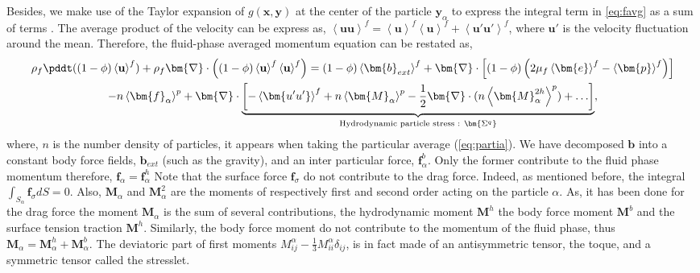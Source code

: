 Besides, we make use of the Taylor expansion of $g(\textbf{x},\bm{y})$ at the center of the particle $\bm{y}_\alpha$ to express the integral term in \ref{eq:favg} as a sum of terms \citep{jackson1997locally}.  
The average product of the velocity can be express as, $\left<\bm{uu}\right>^f = \left<\textbf{u}\right>^f\left<\textbf{u}\right>^f + \left<\bm{u'u'}\right>^f$, where $\bm{u'}$ is the velocity fluctuation around the mean. 
Therefore, the fluid-phase averaged momentum equation can be restated as, 
\begin{multline}
    \rho_f\pddt ((1-\phi)\left<\textbf{u}\right>^f) 
    + \rho_f\bm{\nabla}\cdot\left((1-\phi) \left<\textbf{u}\right>^f\left<\textbf{u}\right>^f\right)
    = (1-\phi)\left<\bm{b}_{ext}\right>^f 
    +\bm{\nabla}\cdot\left[(1-\phi) \left(2\mu_f\left<\bm{e}\right>^f 
    -\left<\bm{p}\right>^f\right)\right]\\
    -n\left<\bm{f}_\alpha\right>^p
    +\bm{\nabla}\cdot
    \underbrace{
        \left[
            - \left<\bm{u'u'}\right>^f 
            +n\left<\bm{M}_\alpha\right>^p 
            -\frac{1}{2}\bm{\nabla}\cdot(n\left<\bm{M}^{2h}_\alpha\right>^p) 
            + \ldots
        \right]
    }_{\text{Hydrodynamic particle stress : } \bm{\Sigma^q}},
    \label{eq:favgsp}
\end{multline}
where, $n$ is the number density of particles, it appears when taking the particular average (\ref{eq:partia}). 
We have decomposed $\bm{b}$ into a constant body force fields, $\bm{b}_{ext}$ (such as the gravity), and an inter particular force, $\bm{f}^b_\alpha$. 
Only the former contribute to the fluid phase momentum therefore, $\bm{f}_\alpha =\bm{f}_\alpha^h$
Note that the surface force $\bm{f}_\sigma$ do not contribute to the drag force. 
Indeed, as mentioned before, the integral $\int_{S_\alpha} \bm{f}_\sigma dS = 0$.  
Also, $\bm{M}_\alpha$ and $\bm{M}^{2}_\alpha$ are the moments of respectively first and second order acting on the particle $\alpha$.
As, it has been done for the drag force the moment $\bm{M}_\alpha$ is the sum of several contributions, the hydrodynamic moment $\bm{M}^h$ the body force moment $\bm{M}^b$ and the surface tension traction $\bm{M}^h$.
Similarly, the body force moment do not contribute to the momentum of the fluid phase, thus $\bm{M}_\alpha = \bm{M}^h_\alpha +\bm{M}_\alpha^b$. 
The deviatoric part of first moments $M_{ij}^\alpha - \frac{1}{3}M_{ii}^\alpha\delta_{ij}$, is in fact made of an antisymmetric tensor, the toque, and a symmetric tensor called the stresslet.
